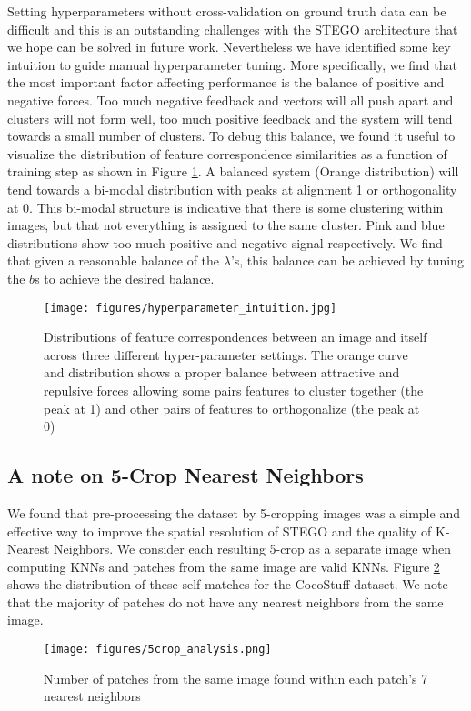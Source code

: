 \documentclass{article} \usepackage{iclr2022_conference,times}
\begin{document}
Setting hyperparameters without cross-validation on ground truth data can be difficult and this is an outstanding challenges with the STEGO architecture that we hope can be solved in future work. Nevertheless we have identified some key intuition to guide manual hyperparameter tuning. More specifically, we find that the most important factor affecting performance is the balance of positive and negative forces. Too much negative feedback and vectors will all push apart and clusters will not form well, too much positive feedback and the system will tend towards a small number of clusters. To debug this balance, we found it useful to visualize the distribution of feature correspondence similarities as a function of training step as shown in Figure \ref{fig:hyperparameter-intuition}. A balanced system (Orange distribution) will tend towards a bi-modal distribution with peaks at alignment 1 or orthogonality at 0. This bi-modal structure is indicative that there is some clustering within images, but that not everything is assigned to the same cluster. Pink and blue distributions show too much positive and negative signal respectively. We find that given a reasonable balance of the $\lambda$'s, this balance can be achieved by tuning the $b$s to achieve the desired balance.

\begin{figure}[h]
    \centering
    \texttt{[image: figures/hyperparameter\_intuition.jpg]}
    \caption{Distributions of feature correspondences between an image and itself across three different hyper-parameter settings. The orange curve and distribution shows a proper balance between attractive and repulsive forces allowing some pairs features to cluster together (the peak at 1) and other pairs of features to orthogonalize (the peak at 0)}
    \label{fig:hyperparameter-intuition}
\end{figure}

\newpage

\subsection{A note on 5-Crop Nearest Neighbors}

We found that pre-processing the dataset by 5-cropping images was a simple and effective way to improve the spatial resolution of STEGO and the quality of K-Nearest Neighbors. We consider each resulting 5-crop as a separate image when computing KNNs and patches from the same image are valid KNNs. Figure \ref{fig:5crop} shows the distribution of these self-matches for the CocoStuff dataset. We note that the majority of patches do not have any nearest neighbors from the same image.



\begin{figure}[h]
    \centering
    \texttt{[image: figures/5crop\_analysis.png]}
    \caption{Number of patches from the same image found within each patch's 7 nearest neighbors}
    \label{fig:5crop}
\end{figure}
\end{document}
